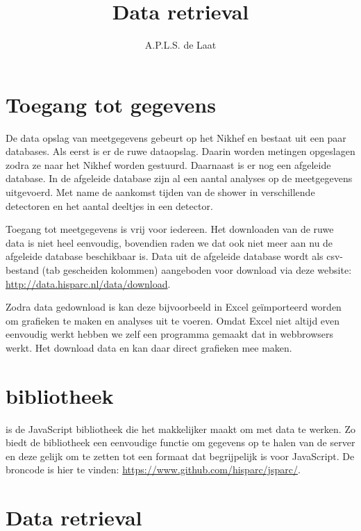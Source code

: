 

\title{Data retrieval}
\author{A.P.L.S. de Laat} 



\maketitle

\section{Toegang tot \hisparc gegevens}

De data opslag van \hisparc meetgegevens gebeurt op het Nikhef en
bestaat uit een paar databases. Als eerst is er de ruwe dataopslag.
Daarin worden metingen opgeslagen zodra ze naar het Nikhef worden
gestuurd. Daarnaast is er nog een afgeleide database. In de afgeleide
database zijn al een aantal analyses op de meetgegevens uitgevoerd. Met
name de aankomst tijden van de shower in verschillende detectoren en het
aantal deeltjes in een detector.

Toegang tot \hisparc meetgegevens is vrij voor iedereen. Het downloaden
van de ruwe data is niet heel eenvoudig, bovendien raden we dat ook niet
meer aan nu de afgeleide database beschikbaar is. Data uit de afgeleide
database wordt als csv-bestand (tab gescheiden kolommen) aangeboden voor
download via deze website: \url{http://data.hisparc.nl/data/download}.

Zodra data gedownload is kan deze bijvoorbeeld in Excel geïmporteerd
worden om grafieken te maken en analyses uit te voeren. Omdat Excel niet
altijd even eenvoudig werkt hebben we zelf een programma gemaakt dat in
webbrowsers werkt. Het download data en kan daar direct grafieken mee
maken.


\section{\jsparc bibliotheek}

\jsparc is de JavaScript bibliotheek die het makkelijker maakt om met
\hisparc data te werken. Zo biedt de bibliotheek een eenvoudige functie
om gegevens op te halen van de \hisparc server en deze gelijk om te
zetten tot een formaat dat begrijpelijk is voor JavaScript. De broncode
is hier te vinden: \url{https://www.github.com/hisparc/jsparc/}.


\section{Data retrieval}

